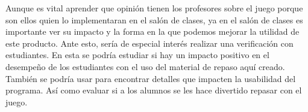  Aunque es vital aprender que opinión tienen los profesores sobre el juego porque son ellos quien lo implementaran en el salón de clases, ya en el salón de clases es importante ver su impacto y la forma en la que podemos mejorar la utilidad de este producto. Ante esto, sería de especial interés realizar una verificación con estudiantes. En esta se podría estudiar si hay un impacto positivo en el desempeño de los estudiantes con el uso del material de repaso aquí creado. También se podría usar para encontrar detalles que impacten la usabilidad del programa. Así como evaluar si a los alumnos se les hace divertido repasar con el juego.


